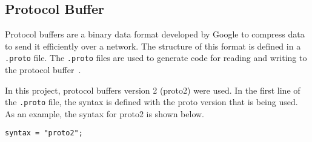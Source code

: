 \documentclass[../MasterThesis.tex]{subfiles}
\begin{document}
\subsection{Protocol Buffer}
\label{subsection:protocolbuffer}


Protocol buffers are a binary data format developed by Google to compress data to send it efficiently over a network. The structure of this format is defined in a \texttt{.proto} file. The \texttt{.proto} files are used to generate code for reading and writing to the protocol buffer~\cite{protobuffer}.



In this project, protocol buffers version 2 (proto2) were used. In the first line of the \texttt{.proto} file, the syntax is defined with the proto version that is being used. As an example, the syntax for proto2 is shown below.

\begin{lstlisting}[style=protobufStyle, numbers=none]
	syntax = "proto2";
\end{lstlisting}
\end{document}
